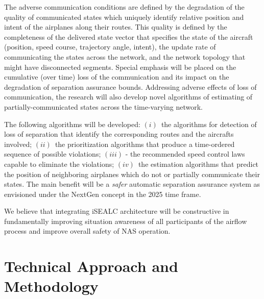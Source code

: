 \documentclass[letter,onecolumn,12pt]{aiaa-tc}
\newcommand{\1}{1_n}
\begin{document}
The adverse communication conditions are defined by the degradation of the quality of communicated states which uniquely identify relative position and intent of the airplanes along their routes. This quality is defined by the completeness of the delivered state vector that specifies the state of the aircraft (position, speed course, trajectory angle, intent), the update rate of communicating the states across the network, and the network topology that might have disconnected segments. Special emphasis will be placed on the cumulative (over time) loss of the communication and its impact on the degradation of separation assurance bounds. Addressing adverse effects of loss of communication, the research will also develop novel algorithms of estimating of partially-communicated states across the time-varying network.

The following algorithms will be developed: $(i)$~the algorithms for detection of loss of separation that identify the corresponding routes and the aircrafts involved; $(ii)$~the prioritization algorithms that produce a time-ordered sequence of possible violations; $(iii)$ - the recommended speed control laws capable to eliminate the violations; $(iv)$~the estimation algorithms that predict the position of neighboring airplanes which do not or partially communicate their states. The main benefit will be a \emph{safer} automatic separation assurance system as envisioned under the NextGen concept in the 2025 time frame.

We believe that integrating iSEALC architecture will be constructive in fundamentally improving situation awareness of all participants of the airflow process and improve overall safety of NAS operation.


\section{Technical Approach and Methodology}

\end{document}
